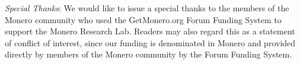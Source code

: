 \documentclass[12pt,english,oneside]{mrl}
\theoremstyle{definition}
\numberwithin{equation}{section}
\numberwithin{figure}{section}
\numberwithin{equation}{section}
\numberwithin{equation}{section}
\numberwithin{figure}{section}
\begin{document}
\emph{Special Thanks}: We would like to issue a special thanks to the members of the Monero community who used the GetMonero.org Forum Funding System to support the Monero Research Lab. Readers may also regard this as a statement of conflict of interest, since our funding is denominated in Monero and provided directly by members of the Monero community by the Forum Funding System.

\medskip{}



\end{document}
